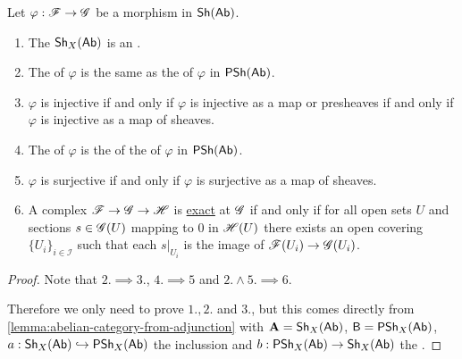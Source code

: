 \documentclass[../main.tex]{subfiles}
\begin{document}
\begin{proposition}
  Let \(\varphi: \mathscr{F} \to \mathscr{G}\) be a morphism in \(\mathsf{Sh}(\mathsf{Ab})\).
  \begin{enumerate}
    \item The  \(\mathsf{Sh}_{X}(\mathsf{Ab})\) is an .
    \item The  of \(\varphi\) is the same as the  of \(\varphi\) in \(\mathsf{PSh}(\mathsf{Ab})\).
    \item \(\varphi\) is injective if and only if \(\varphi\) is injective as a map or presheaves if and only if \(\varphi\) is injective as a map of sheaves.
    \item The  of \(\varphi\) is the  of the  of \(\varphi\) in \(\mathsf{PSh}(\mathsf{Ab})\).
    \item \(\varphi\) is surjective if and only if \(\varphi\) is surjective as a map of sheaves.
    \item A complex \(\mathscr{F} \to \mathscr{G} \to \mathscr{H}\) is \hyperref[def:exact-complex]{exact} at \(\mathscr{G}\) if and only if for all open sets \(U\) and sections \(s \in \mathscr{G}(U)\) mapping to 0 in \(\mathscr{H}(U)\) there exists an open covering \(\{U_{i}\}_{i \in \mathcal{I}}\) such that each \(s|_{U_{i}}\) is the image of \(\mathscr{F}(U_{i}) \to \mathscr{G}(U_{i})\).
  \end{enumerate}
\end{proposition}
\begin{proof}
  Note that \(2. \implies 3.\), \(4. \implies 5\) and \(2. \land 5. \implies 6.\)

  Therefore we only need to prove \(1., 2.\) and \(3.\), but this comes directly from \autoref{lemma:abelian-category-from-adjunction} with \(\mathbf{A} = \mathsf{Sh}_{X}(\mathsf{Ab})\), \(\mathsf{B} = \mathsf{PSh}_{X}(\mathsf{Ab})\), \(a: \mathsf{Sh}_{X}(\mathsf{Ab}) \hookrightarrow \mathsf{PSh}_{X}(\mathsf{Ab})\) the inclussion  and \(b: \mathsf{PSh}_{X}(\mathsf{Ab}) \to \mathsf{Sh}_{X}(\mathsf{Ab})\) the  .
\end{proof}
\end{document}
